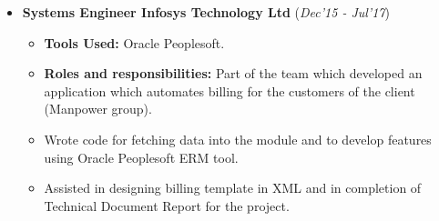 \documentclass[10pt]{article}
\begin{document}
\hspace{-0.25cm}
\colorbox{bl}{}




\begin{itemize}[leftmargin=0.4cm]
	\item \textbf{Systems Engineer \textpipe  \hspace{0.05cm} Infosys Technology Ltd} \hfill{(\textit{Dec'15 - Jul'17})}
	
	\begin{itemize}
	    \item  \textbf{Tools Used:} Oracle Peoplesoft.
		\item \textbf{Roles and responsibilities:} Part of the team which developed an application which automates billing for the customers of the client (Manpower group).
		\item Wrote code for fetching data into the module and to develop features using Oracle Peoplesoft ERM tool.
		\item Assisted in designing billing template in XML and in completion of Technical Document Report for the project.
	
	\end{itemize}
\end{itemize}


\colorbox{bl}{}
\end{document}
